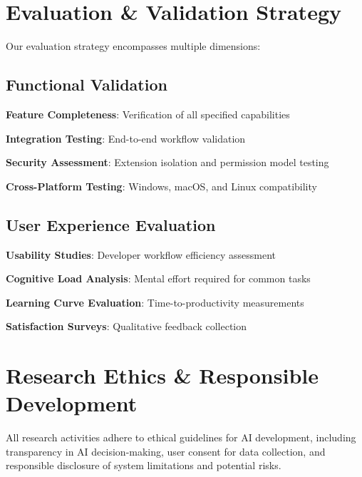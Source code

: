 \section*{Evaluation \& Validation Strategy}

Our evaluation strategy encompasses multiple dimensions:

\subsection*{Functional Validation}
\begin{compactlist}
    \item \textbf{Feature Completeness}: Verification of all specified capabilities
    \item \textbf{Integration Testing}: End-to-end workflow validation
    \item \textbf{Security Assessment}: Extension isolation and permission model testing
    \item \textbf{Cross-Platform Testing}: Windows, macOS, and Linux compatibility
\end{compactlist}

\subsection*{User Experience Evaluation}
\begin{compactlist}
    \item \textbf{Usability Studies}: Developer workflow efficiency assessment
    \item \textbf{Cognitive Load Analysis}: Mental effort required for common tasks
    \item \textbf{Learning Curve Evaluation}: Time-to-productivity measurements
    \item \textbf{Satisfaction Surveys}: Qualitative feedback collection
\end{compactlist}

\section*{Research Ethics \& Responsible Development}

\begin{alertbox}
All research activities adhere to ethical guidelines for AI development, including transparency in AI decision-making, user consent for data collection, and responsible disclosure of system limitations and potential risks.
\end{alertbox}

